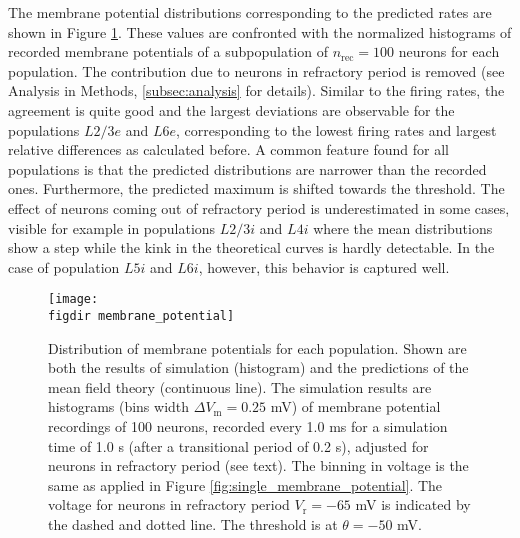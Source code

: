 The membrane potential distributions corresponding to the predicted rates are
shown in Figure \ref{fig:membrane_potential}. 
These values are confronted with the normalized histograms of recorded 
membrane potentials of a subpopulation of $n_\text{rec} = 100$ neurons for 
each population. The contribution due to neurons in refractory period is removed
(see Analysis in Methods, \ref{subsec:analysis} for details). 
Similar to the firing rates, 
the agreement is quite good and the largest deviations are observable for  
the populations $L2/3e$ and $L6e$, corresponding to the lowest firing rates and
largest relative differences as calculated before. A common feature found for all
populations is that the predicted distributions are narrower than the recorded ones.
Furthermore, the predicted maximum is shifted towards the threshold. The effect
of neurons coming out of refractory period is underestimated in some cases, 
visible for example in populations $L2/3i$ and $L4i$ where the mean distributions 
show a step while the kink in the theoretical curves is hardly detectable. 
In the case of population $L5i$ and $L6i$, however, this behavior is captured well. 

\begin{figure}[htpb]
    \centering
    \texttt{[image: \\figdir membrane\_potential]}
    \caption{
        Distribution of membrane potentials for each population. 
        Shown are both the results of simulation (histogram) and 
        the predictions of the mean field theory (continuous line). 
        The simulation results are histograms (bins width $\Delta V_\text{m} = 0.25$ mV) 
        of membrane potential recordings 
        of 100 neurons, recorded every 1.0 ms for a simulation time of 1.0 s 
        (after a transitional period of 0.2 s), 
        adjusted for neurons in refractory period (see text). 
        The binning in voltage is the same as applied in Figure 
        \ref{fig:single_membrane_potential}. 
        The voltage for neurons in refractory period $V_\text{r} = -65$ mV 
        is indicated by the dashed and dotted line. The threshold is at 
        $\theta = -50$ mV. 
    }
    \label{fig:membrane_potential}
\end{figure}

